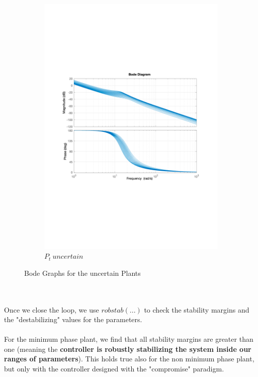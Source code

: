 \documentclass[a4paper, 12pt]{article}
\begin{document}
\begin{figure}[h!]
\begin{subfigure}[b]{0.45\textwidth}
        \includegraphics[width=\textwidth]
         {Figures/fig06b.pdf}
        \caption{$P_t\ uncertain$}
        \label{fig:fig06b}
    \end{subfigure}
    \caption{Bode Graphs for the uncertain Plants}
    \label{fig:fig06}
\end{figure}
\\\\Once we close the loop, we use $robstab(...)$ to check the stability margins and the "destabilizing" values for the parameters.\\\\
For the minimum phase plant, we find that all stability margins are greater than one (meaning the \textbf{controller is robustly stabilizing the system inside our ranges of parameters}). This holds true also for the non minimum phase plant, but only with the controller designed with the "compromise" paradigm.
\end{document}
